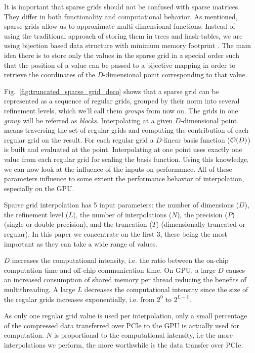 It is important that sparse grids should not be confused with sparse matrices.
They differ in both functionality and computational behavior. As mentioned,
sparse grids allow us to approximate multi-dimensional functions. Instead of
using the traditional approach of storing them in trees and hash-tables, we are
using bijection based data structure with minimum memory footprint
\cite{Murarasu:2011:CDS:1941553.1941559}. The main idea there is to store only
the values in the sparse grid in a special order such that the position of a
value can be passed to a bijective mapping in order to retrieve the coordinates
of the $D$-dimensional point corresponding to that value.

Fig.~\ref{fig:truncated_sparse_grid_deco} shows that a sparse grid can be
represented as a sequence of regular grids, grouped by their norm into several
refinement levels, which we'll call them \textit{groups} from now on. The grids
in one \textit{group} will be referred as \textit{blocks}.
Interpolating at a given $D$-dimensional point means traversing the set of
regular grids and computing the contribution of each regular grid on the result. For
each regular grid a $D$-linear basis function ($\Otime{D}$) is built and
evaluated at the point. Interpolating at one point uses exactly one value from each
regular grid for scaling the basis function. Using this knowledge, we can now
look at the influence of the inputs on performance. All of these parameters
influence to some extent the performance behavior of interpolation, especially
on the GPU.

Sparse grid interpolation has 5 input parameters: the number of dimensions
($D$), the refinement level ($L$), the number of interpolations ($N$), the
precision ($P$) (single or double precision), and the truncation ($T$)
(dimensionally truncated or regular). In this paper we concentrate on the first
3, these being the most important as they can take a wide range of values.

$D$ increases the computational intensity, i.e. the ratio between the on-chip
computation time and off-chip communication time. On GPU, a large $D$ causes an
increased consumption of shared memory per thread reducing the benefits of
multithreading. A large $L$ decreases the computational intensity since the size
of the regular grids increases exponentially, i.e. from $2^0$ to $2^{L-1}$. 

As only one regular grid value is used per interpolation, only a small
percentage of the compressed data transferred over PCIe to the GPU is actually
used for computation. $N$ is proportional to the computational intensity, i.e
the more interpolations we perform, the more worthwhile is the data transfer over
PCIe.

